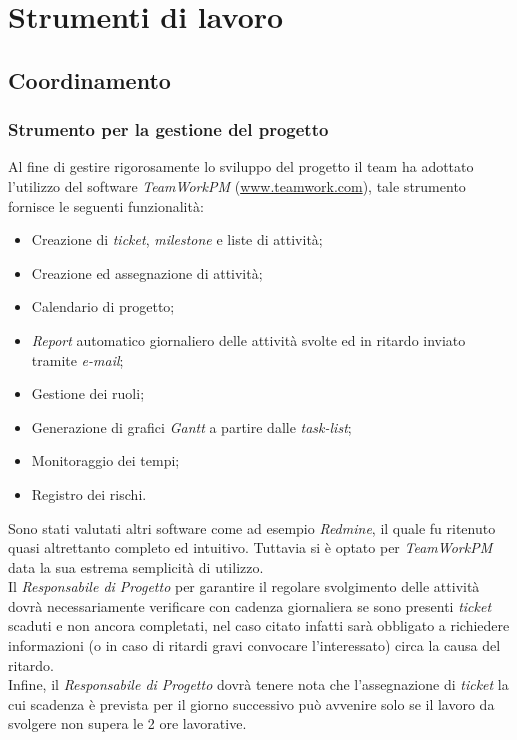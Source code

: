 \section{Strumenti di lavoro}
\subsection{Coordinamento}
\subsubsection{Strumento per la gestione del progetto}
Al fine di gestire rigorosamente lo sviluppo del progetto il team \gruppo{} ha adottato l'utilizzo del software \textit{TeamWorkPM} (\href{http://www.teamwork.com}{www.teamwork.com}), tale strumento fornisce le seguenti funzionalità:

\begin{itemize}
\item Creazione di \textit{ticket}, \textit{milestone} e liste di attività;
\item Creazione ed assegnazione di attività;
\item Calendario di progetto;
\item \textit{Report} automatico giornaliero delle attività svolte ed in ritardo inviato tramite \textit{e-mail};
\item Gestione dei ruoli;
\item Generazione di grafici \textit{Gantt} a partire dalle \textit{task-list};
\item Monitoraggio dei tempi;
\item Registro dei rischi.
\end{itemize}

Sono stati valutati altri software come ad esempio \textit{Redmine}, il quale fu ritenuto quasi altrettanto completo ed intuitivo. Tuttavia si è optato per \textit{TeamWorkPM} data la sua estrema semplicità di utilizzo.\\
Il \textit{Responsabile di Progetto} per garantire il regolare svolgimento delle attività dovrà necessariamente verificare con cadenza giornaliera se sono presenti \textit{ticket} scaduti e non ancora completati, nel caso citato infatti sarà obbligato a richiedere informazioni (o in caso di ritardi gravi convocare l'interessato) circa la causa del ritardo.\\
Infine, il \textit{Responsabile di Progetto} dovrà tenere nota che l'assegnazione di \textit{ticket} la cui scadenza è prevista per il giorno successivo può avvenire solo se il lavoro da svolgere non supera le 2 ore lavorative.

